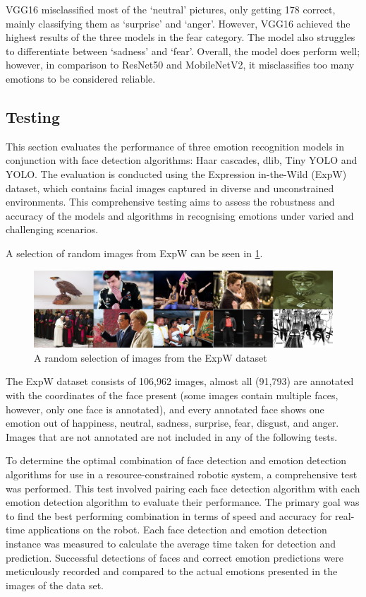 VGG16 misclassified most of the `neutral' pictures, only getting 178 correct, mainly classifying them as `surprise' and `anger'. However, VGG16 achieved the highest results of the three models in the fear category. The model also struggles to differentiate between `sadness' and `fear'. Overall, the model does perform well; however, in comparison to ResNet50 and MobileNetV2, it misclassifies too many emotions to be considered reliable.

\subsection{Testing}

This section evaluates the performance of three emotion recognition models in conjunction with face detection algorithms: Haar cascades, dlib, Tiny YOLO and YOLO. The evaluation is conducted using the Expression in-the-Wild (ExpW) dataset, which contains facial images captured in diverse and unconstrained environments. This comprehensive testing aims to assess the robustness and accuracy of the models and algorithms in recognising emotions under varied and challenging scenarios.

A selection of random images from ExpW can be seen in \ref{figure:exp_w_sample}.

\begin{figure}[!htb]
    \centering{}
    \includegraphics[scale=0.18]{fed_images/exp_w_sample.jpg}
    \caption{A random selection of images from the ExpW dataset}
    \label{figure:exp_w_sample}
\end{figure}

The ExpW dataset consists of 106,962 images, almost all (91,793) are annotated with the coordinates of the face present (some images contain multiple faces, however, only one face is annotated), and every annotated face shows one emotion out of happiness, neutral, sadness, surprise, fear, disgust, and anger. Images that are not annotated are not included in any of the following tests.

To determine the optimal combination of face detection and emotion detection algorithms for use in a resource-constrained robotic system, a comprehensive test was performed. This test involved pairing each face detection algorithm with each emotion detection algorithm to evaluate their performance. The primary goal was to find the best performing combination in terms of speed and accuracy for real-time applications on the robot. Each face detection and emotion detection instance was measured to calculate the average time taken for detection and prediction. Successful detections of faces and correct emotion predictions were meticulously recorded and compared to the actual emotions presented in the images of the data set.

